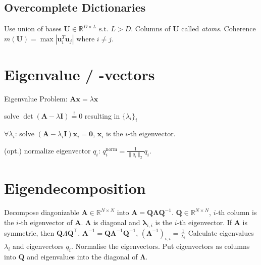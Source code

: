 \documentclass[a4paper, 11pt, landscape]{article}
\begin{document}
\begin{multicols*}{3}
\subsection{Overcomplete Dictionaries}
Use union of bases $\mathbf{U} \in \mathbb{R}^{D\times L} \text{ s.t. } L > D$. Columns of $\mathbf{U}$ called \emph{atoms}.
Coherence $m(\mathbf{U}) = \max |\mathbf{u}^T_i \mathbf{u}_j|\text{ where } i\neq j$.

\section{Eigenvalue / -vectors}
Eigenvalue Problem: $\mathbf{Ax} = \lambda \mathbf{x}$
\begin{compactenum}
	\item solve $\operatorname{det}(\mathbf{A} - \lambda \mathbf{I}) \overset{!}{=} 0$ resulting in $\{\lambda_i\}_i$
	\item $\forall \lambda_i$:
		solve $(\mathbf{A} - \lambda_i \mathbf{I}) \mathbf{x}_i = \mathbf{0}$, $\mathbf{x}_i$ is the $i$-th eigenvector.
	\item (opt.) normalize eigenvector $q_i$: $q_i^{\text{norm}} = \frac{1}{\|q_i\|_2} q_i$.
\end{compactenum}

\section{Eigendecomposition}
Decompose diagonizable $\mathbf{A} \in \mathbb{R}^{N \times N}$ into $\mathbf{A} = \mathbf{Q} \boldsymbol{\Lambda} \mathbf{Q}^{-1}$. $\mathbf{Q} \in \mathbb{R}^{N \times N}$, $i$-th column is the $i$-th eigenvector of $\mathbf{A}$. $\boldsymbol{\Lambda}$ is diagonal and $\boldsymbol{\lambda}_{i,i}$ is the $i$-th eigenvector. If $\mathbf{A}$ is symmetric, then $\mathbf{Q}\Lambda \mathbf{Q}^\top$.
$\mathbf{A}^{-1} = \mathbf{Q} \boldsymbol{\Lambda}^{-1} \mathbf{Q}^{-1}$, $(\boldsymbol{\Lambda}^{-1})_{i,i} = \frac{1}{\lambda_i}$
Calculate eigenvalues $\lambda_i$ and eigenvectors $q_i$. Normalise the eigenvectors. Put eigenvectors as columns into $\mathbf{Q}$ and eigenvalues into the diagonal of $\boldsymbol{\Lambda}$.


\end{multicols*}
\end{document}
